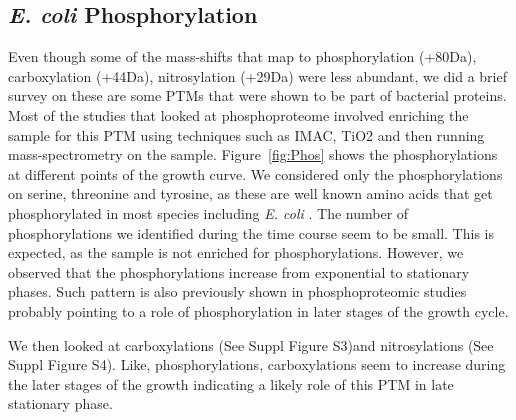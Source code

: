 \documentclass[12pt]{article}
\begin{document}


\subsection{\emph{E. coli} Phosphorylation}

Even though some of the mass-shifts that map to phosphorylation (+80Da), carboxylation (+44Da), nitrosylation (+29Da) were less abundant, we did a brief survey on these are some PTMs that were shown to be part of bacterial proteins. Most of the studies that looked at phosphoproteome involved enriching the sample for this PTM using techniques such as IMAC, TiO2 and then running mass-spectrometry on the sample. Figure~\ref{fig:Phos} shows the phosphorylations at different points of the growth curve. We considered only the phosphorylations on serine, threonine and tyrosine, as these are well known amino acids that get phosphorylated in most species including \emph{E. coli} \cite{Maceketal2008}. The number of phosphorylations we identified during the time course seem to be small. This is expected, as the sample is not enriched for phosphorylations. However, we observed that the phosphorylations increase from exponential to stationary phases. Such pattern is also previously shown in phosphoproteomic studies \cite{Soaresetal2013} probably pointing to a role of phosphorylation in later stages of the growth cycle.

We then looked at carboxylations (See Suppl Figure S3)and nitrosylations (See Suppl Figure S4). Like, phosphorylations, carboxylations seem to increase during the later stages of the growth indicating a likely role of this PTM in late stationary phase. 
\end{document}
